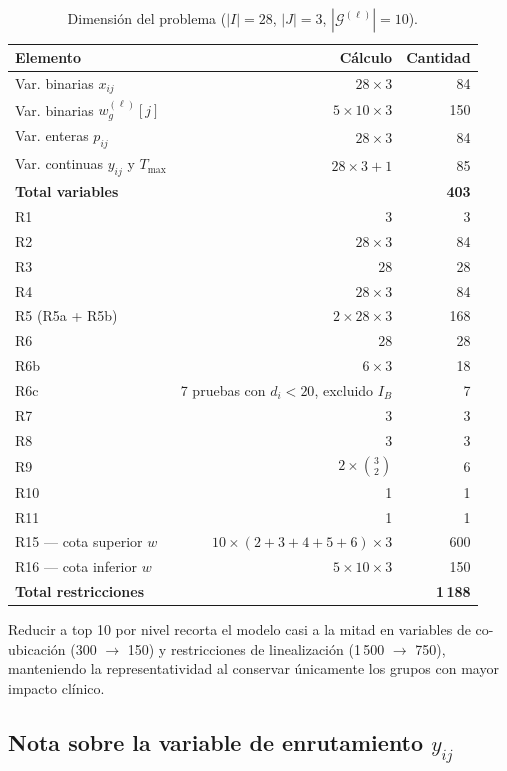\documentclass[12pt, a4paper]{article}
\begin{document}
\begin{table}[H]
\centering
\caption{Dimensión del problema ($|I|=28$, $|J|=3$, $|\mathcal{G}^{(\ell)}|=10$).}
\begin{tabular}{lrr}
\toprule
\textbf{Elemento} & \textbf{Cálculo} & \textbf{Cantidad} \\
\midrule
Var. binarias $x_{ij}$ & $28 \times 3$ & 84 \\
Var. binarias $w_g^{(\ell)}[j]$ & $5 \times 10 \times 3$ & 150 \\
Var. enteras $p_{ij}$ & $28 \times 3$ & 84 \\
Var. continuas $y_{ij}$ y $T_{\max}$ & $28 \times 3 + 1$ & 85 \\
\textbf{Total variables} & & \textbf{403} \\
\midrule
R1 & $3$ & 3 \\
R2 & $28 \times 3$ & 84 \\
R3 & $28$ & 28 \\
R4 & $28 \times 3$ & 84 \\
R5 (R5a + R5b) & $2 \times 28 \times 3$ & 168 \\
R6 & $28$ & 28 \\
R6b & $6 \times 3$ & 18 \\
R6c & 7 pruebas con $d_i < 20$, excluido $I_B$ & 7 \\
R7 & $3$ & 3 \\
R8 & $3$ & 3 \\
R9 & $2 \times \binom{3}{2}$ & 6 \\
R10 & 1 & 1 \\
R11 & 1 & 1 \\
R15 — cota superior $w$ & $10 \times (2{+}3{+}4{+}5{+}6) \times 3$ & 600 \\
R16 — cota inferior $w$ & $5 \times 10 \times 3$ & 150 \\
\textbf{Total restricciones} & & \textbf{1\,188} \\
\bottomrule
\end{tabular}
\end{table}

Reducir a top 10 por nivel recorta el modelo casi a la mitad en variables de co-ubicación
(300 $\to$ 150) y restricciones de linealización (1\,500 $\to$ 750), manteniendo la
representatividad al conservar únicamente los grupos con mayor impacto clínico.

\subsection{Nota sobre la variable de enrutamiento $y_{ij}$}
\end{document}
